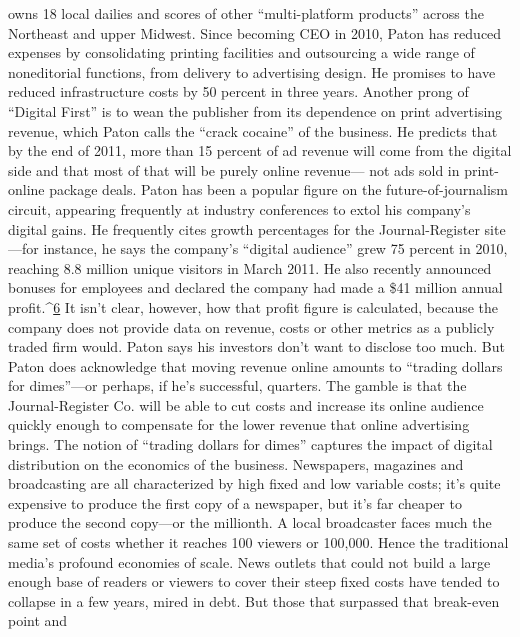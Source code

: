 owns 18 local dailies and scores of other ``multi-platform products'' across the
Northeast and upper Midwest. Since becoming CEO in 2010, Paton has reduced
expenses by consolidating printing facilities and outsourcing a wide range of
noneditorial functions, from delivery to advertising design. He promises to have
reduced infrastructure costs by 50 percent in three years.
Another prong of ``Digital First'' is to wean the publisher from its dependence
on print advertising revenue, which Paton calls the ``crack cocaine'' of the business.
He predicts that by the end of 2011, more than 15 percent of ad revenue
will come from the digital side and that most of that will be purely online revenue—
not ads sold in print-online package deals.
Paton has been a popular figure on the future-of-journalism circuit, appearing
frequently at industry conferences to extol his company's digital gains. He
frequently cites growth percentages for the Journal-Register site—for instance,
he says the company's ``digital audience'' grew 75 percent in 2010, reaching 8.8
million unique visitors in March 2011. He also recently announced bonuses for
employees and declared the company had made a \$41 million annual profit.^{\href{#endnotes-chapter-7}{6}} It
isn't clear, however, how that profit figure is calculated, because the company
does not provide data on revenue, costs or other metrics as a publicly traded firm
would. Paton says his investors don't want to disclose too much.
But Paton does acknowledge that moving revenue online amounts to ``trading
dollars for dimes''—or perhaps, if he's successful, quarters. The gamble is
that the Journal-Register Co. will be able to cut costs and increase its online
audience quickly enough to compensate for the lower revenue that online
advertising brings.
The notion of ``trading dollars for dimes'' captures the impact of digital distribution
on the economics of the business. Newspapers, magazines and broadcasting
are all characterized by high fixed and low variable costs; it's quite expensive
to produce the first copy of a newspaper, but it's far cheaper to produce the
second copy—or the millionth. A local broadcaster faces much the same set of
costs whether it reaches 100 viewers or 100,000. Hence the traditional media's
profound economies of scale. News outlets that could not build a large enough
base of readers or viewers to cover their steep fixed costs have tended to collapse
in a few years, mired in debt. But those that surpassed that break-even point and
